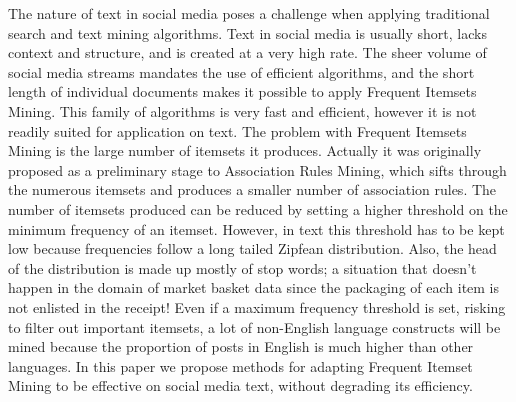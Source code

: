 \documentclass{sig-alternate}
\begin{document}
The nature of text in social media poses a challenge when applying traditional search and text mining algorithms. Text in social media is usually short, lacks context and structure, and is created at a very high rate. The sheer volume of social media streams mandates the use of efficient algorithms, and the short length of individual documents makes it possible to apply Frequent Itemsets Mining. This family of algorithms is very fast and efficient, however it is not readily suited for application on text. The problem with Frequent Itemsets Mining is the large number of itemsets it produces.
Actually it was originally proposed as a preliminary stage to Association Rules Mining, which sifts through the numerous itemsets and produces a smaller number of association rules. The number of itemsets produced can be reduced by setting a higher threshold on the minimum frequency of an itemset. However, in text this threshold has to be kept low because frequencies follow a long tailed Zipfean distribution. Also, the head of the distribution is made up mostly of stop words; a situation that doesn't happen in the domain of market basket data since the packaging of each item is not enlisted in the receipt!
Even if a maximum frequency threshold is set, risking to filter out important itemsets, a lot of non-English language constructs will be mined because the proportion of posts in English is much higher than other languages. In this paper we propose methods for adapting Frequent Itemset Mining to be effective on social media text, without degrading its efficiency. %
\end{document}

